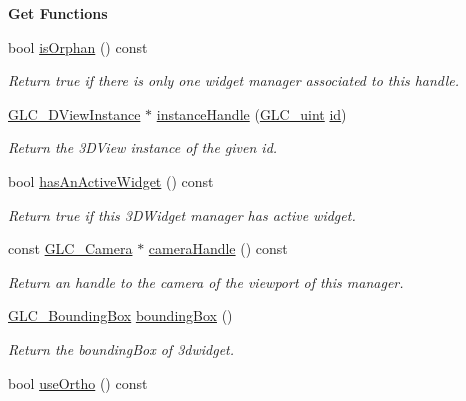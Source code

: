 \begin{Indent}{\bf Get Functions}\par
\begin{DoxyCompactItemize}
\item 
bool \hyperlink{class_g_l_c__3_d_widget_manager_handle_a58a7d517830d0e7867b7974b0322ec40}{is\-Orphan} () const 
\begin{DoxyCompactList}\small\item\em Return true if there is only one widget manager associated to this handle. \end{DoxyCompactList}\item 
\hyperlink{class_g_l_c__3_d_view_instance}{G\-L\-C\-\_\-D\-View\-Instance} $\ast$ \hyperlink{class_g_l_c__3_d_widget_manager_handle_ac8b495e4c3b14e4aa7c726c6d639fd9c}{instance\-Handle} (\hyperlink{glc__global_8h_abf950976fabed69026558df8e2da6c6b}{G\-L\-C\-\_\-uint} \hyperlink{glext_8h_a58c2a664503e14ffb8f21012aabff3e9}{id})
\begin{DoxyCompactList}\small\item\em Return the 3\-D\-View instance of the given id. \end{DoxyCompactList}\item 
bool \hyperlink{class_g_l_c__3_d_widget_manager_handle_a75db6f8a89f9f6ee74f88274a7a46f99}{has\-An\-Active\-Widget} () const 
\begin{DoxyCompactList}\small\item\em Return true if this 3\-D\-Widget manager has active widget. \end{DoxyCompactList}\item 
const \hyperlink{class_g_l_c___camera}{G\-L\-C\-\_\-\-Camera} $\ast$ \hyperlink{class_g_l_c__3_d_widget_manager_handle_a65ca53e42cb4b2e07fd78f5bbbc9bd68}{camera\-Handle} () const 
\begin{DoxyCompactList}\small\item\em Return an handle to the camera of the viewport of this manager. \end{DoxyCompactList}\item 
\hyperlink{class_g_l_c___bounding_box}{G\-L\-C\-\_\-\-Bounding\-Box} \hyperlink{class_g_l_c__3_d_widget_manager_handle_a2af890c0e1179eff5dd690f7a7e901e5}{bounding\-Box} ()
\begin{DoxyCompactList}\small\item\em Return the bounding\-Box of 3dwidget. \end{DoxyCompactList}\item 
bool \hyperlink{class_g_l_c__3_d_widget_manager_handle_ae1fa285870498ddda8265afdd817a9c7}{use\-Ortho} () const 

\end{DoxyCompactItemize}
\end{Indent}
